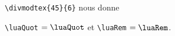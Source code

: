 \documentclass[varwidth, border = 3pt]{standalone}
\begin{document}
%
%
\verb+\divmodtex{45}{6}+ nous donne

\verb+\luaQuot+ $= \luaQuot$
et
\verb+\luaRem+  $= \luaRem$.
\end{document}

